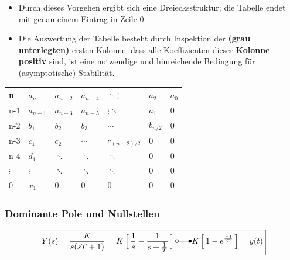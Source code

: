 \begin{minipage}{9cm}
	\begin{itemize}
		\item Durch dieses Vorgehen ergibt sich eine Dreiecksstruktur; die Tabelle endet mit
		genau einem Eintrag in Zeile 0.
		\item Die Auswertung der Tabelle besteht durch Inspektion der \textbf{(grau unterlegten)}
		ersten Kolonne: dass alle Koeffizienten dieser \textbf{Kolonne positiv} sind, ist eine
		notwendige und hinreichende Bedingung für (asymptotische) Stabilität.
	\end{itemize}
\end{minipage}
\hspace{0.5cm}
\begin{minipage}{6cm}
	\begin{tabular}{|l||l|l|l|l|l|l|}
	\hline
		n & \cellcolor{hellgrau}$a_n$ & $a_{n-2}$ & $a_{n-4}$ & $\ddots\vdots$ & $a_{2}$  & $a_{0}$ \\ \hline
		n-1 & \cellcolor{hellgrau} $a_{n-1}$ & $a_{n-3}$ & $a_{n-5}$ & $\vdots\ddots$ & $a_{1}$  & 0 \\ \hline\hline
		n-2 & \cellcolor{hellgrau} $b_{1}$ & $b_{2}$ & $b_{3}$ & $\cdots$ & $b_{n/2}$  & 0 \\ \hline
		n-3 & \cellcolor{hellgrau} $c_{1}$ & $c_{2}$ & $\cdots$ & $c_{(n-2)/2}$ & 0 & 0 \\ \hline
		n-4 & \cellcolor{hellgrau} $d_{1}$ & $\ddots$ & $\ddots$ & $\ddots$ & 0 & 0 \\ \hline
		$\vdots$ & \cellcolor{hellgrau} $\vdots$ &  $\ddots$ & $\ddots$ & $\ddots$ & 0 & 0 \\ \hline
		0 & \cellcolor{hellgrau} $x_1$ & 0 & 0 & 0 & 0 & 0 \\ \hline
	\end{tabular}
\end{minipage}



\subsubsection{Dominante Pole und Nullstellen }

\begin{equation}
\boxed{Y(s)=\frac{K}{s(sT+1)}=K\mathop{\Big[}\frac{1}{s}-\frac{1}{s+\frac{1}{T}}\mathop{\Big]} \laplace K\mathop{\Big[}1-e^{\frac{-1}{T}}\mathop{\Big]}=y(t)}
\end{equation}

